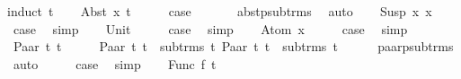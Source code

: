 \begin{isabellebody}
%
\isadelimproof
%
\endisadelimproof
%
\isatagproof
{}\isamarkupfalse%
{\isacharparenleft}{\kern0pt}induct\ t{\isacharparenright}{\kern0pt}\isanewline
\ \ \isamarkupfalse%
\ {\isacharparenleft}{\kern0pt}Abst\ x{}\ t{\isacharparenright}{\kern0pt}\isanewline
\ \ \isamarkupfalse%
\ \isamarkupfalse%
\ {\isacharquery}{\kern0pt}case\ \isanewline
\ \ \ \ \isamarkupfalse%
\ abst{\isacharunderscore}{\kern0pt}psub{\isacharunderscore}{\kern0pt}trms\ \isamarkupfalse%
\ auto\isanewline
{}\isamarkupfalse%
\isanewline
\ \ \isamarkupfalse%
\ {\isacharparenleft}{\kern0pt}Susp\ x{}\ x{}{\isacharparenright}{\kern0pt}\isanewline
\ \ \isamarkupfalse%
\ \isamarkupfalse%
\ {\isacharquery}{\kern0pt}case\ \isamarkupfalse%
\ simp\isanewline
{}\isamarkupfalse%
\isanewline
\ \ \isamarkupfalse%
\ Unit\isanewline
\ \ \isamarkupfalse%
\ \isamarkupfalse%
\ {\isacharquery}{\kern0pt}case\ \isamarkupfalse%
\ simp\isanewline
{}\isamarkupfalse%
\isanewline
\ \ \isamarkupfalse%
\ {\isacharparenleft}{\kern0pt}Atom\ x{\isacharparenright}{\kern0pt}\isanewline
\ \ \isamarkupfalse%
\ \isamarkupfalse%
\ {\isacharquery}{\kern0pt}case\ \isamarkupfalse%
\ simp\isanewline
{}\isamarkupfalse%
\isanewline
\ \ \isamarkupfalse%
\ {\isacharparenleft}{\kern0pt}Paar\ t{}\ t{}{\isacharparenright}{\kern0pt}\isanewline
\ \ \isamarkupfalse%
\ \isamarkupfalse%
\ {\isachardoublequoteopen}Paar\ t{}\ t{}\ {\isasymnotin}\ sub{\isacharunderscore}{\kern0pt}trms\ t{}{\isachardoublequoteclose}\ {\isachardoublequoteopen}Paar\ t{}\ t{}\ {\isasymnotin}\ sub{\isacharunderscore}{\kern0pt}trms\ t{}{\isachardoublequoteclose}\isanewline
\ \ \ \ \isamarkupfalse%
\ paar{\isacharunderscore}{\kern0pt}psub{\isacharunderscore}{\kern0pt}trms\ \isamarkupfalse%
\ auto\isanewline
\ \ \isamarkupfalse%
\ \isamarkupfalse%
\ {\isacharquery}{\kern0pt}case\ \isamarkupfalse%
\ simp\isanewline
{}\isamarkupfalse%
\isanewline
\ \ \isamarkupfalse%
\ {\isacharparenleft}{\kern0pt}Func\ f\ t{\isacharparenright}{\kern0pt}\isanewline

\end{isabellebody}
